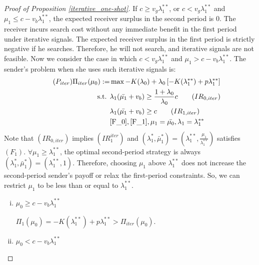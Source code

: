 \documentclass[11pt]{extarticle}
\begin{document}
\begin{proof}[Proof of Proposition \ref{iterative_one-shot}]
	If $c \geq v_g\lambda_1^{**}$, or $c < v_g\lambda_1^{**}$ and $\mu_1 \leq c-v_b\lambda_1^{**}$, the expected receiver surplus in the second period is 0. The receiver incurs search cost without any immediate benefit in the first period under iterative signals. The expected receiver surplus in the first period is strictly negative if he searches. Therefore, he will not search, and iterative signals are not feasible. Now we consider the case in which $c < v_g\lambda_1^{**}$ and $\mu_1 > c-v_b\lambda_1^{**}$. The sender's problem when she uses such iterative signals is:
	\begin{align}\tag{$P_{iter}$} \label{Piter}
	\Pi_{iter}(\mu_0) :=& \max -K(\lambda_0) + \lambda_0 \left[-K(\lambda_1^{**})+p \lambda_1^{**} \right] \nonumber\\
	\text{s.t. } &\lambda_1 (\bar{\mu_1} + v_b) \geq \frac{1+\lambda_0}{\lambda_0} c \tag{$IR_{0,iter}$} \label{IR_0_iter}\\
	&\lambda_1 (\bar{\mu_1} + v_b) \geq c \tag{$IR_{1,iter}$} \label{IR_1_iter}\\
	&\eqref{F_0}, \eqref{F_1}, \mu_1 = \bar{\mu_0}, \lambda_1 = \lambda_1^{**}\nonumber
	\end{align}
	Note that $(IR_{0,iter})$ implies $(IR_1^{iter})$ and $(\lambda_1^*,\bar{\mu}_1^*)=(\lambda_1^{**},\frac{\mu_1}{\lambda_1^{**}})$ satisfies $(F_1)$. $\forall \mu_1 \geq \lambda_1^{**}$, the optimal second-period strategy is always $(\lambda_1^*,\bar{\mu}_1^*)=(\lambda_1^{**},1)$. Therefore, choosing $\mu_1$ above $\lambda_1^{**}$ does not increase the second-period sender's payoff or relax the first-period constraints. So, we can restrict $\mu_1$ to be less than or equal to $\lambda_1^{**}$.
	
	\begin{enumerate}[i)]
		\item $\mu_0 \geq c-v_b\lambda_1^{**}$
		
		$\Pi_1(\mu_0) = -K(\lambda_1^{**})+p \lambda_1^{**} > \Pi_{iter}(\mu_0)$.
		
		\item $\mu_0 < c-v_b\lambda_1^{**}$
		

\end{enumerate}
\end{proof}
\end{document}
